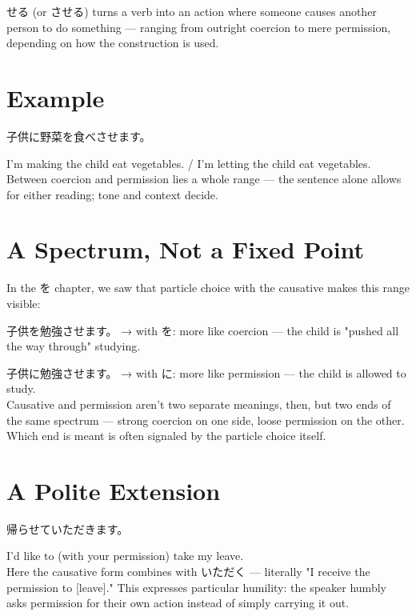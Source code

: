 \documentclass[12pt]{book}
\begin{document}
せる (or させる) turns a verb into an action where someone causes another person to do something — ranging from outright coercion to mere permission, depending on how the construction is used.

\section*{Example}

\par\quad 子供に野菜を食べさせます。\\
\par\quad I'm making the child eat vegetables. / I'm letting the child eat vegetables.\\

Between coercion and permission lies a whole range — the sentence alone allows for either reading; tone and context decide.

\section*{A Spectrum, Not a Fixed Point}

In the を chapter, we saw that particle choice with the causative makes this range visible:

\par\quad 子供を勉強させます。 → with を: more like coercion — the child is "pushed all the way through" studying.\\
\par\quad 子供に勉強させます。 → with に: more like permission — the child is allowed to study.\\

Causative and permission aren't two separate meanings, then, but two ends of the same spectrum — strong coercion on one side, loose permission on the other. Which end is meant is often signaled by the particle choice itself.

\section*{A Polite Extension}

\par\quad 帰らせていただきます。\\
\par\quad I'd like to (with your permission) take my leave.\\

Here the causative form combines with いただく — literally "I receive the permission to [leave]." This expresses particular humility: the speaker humbly asks permission for their own action instead of simply carrying it out.
\end{document}
